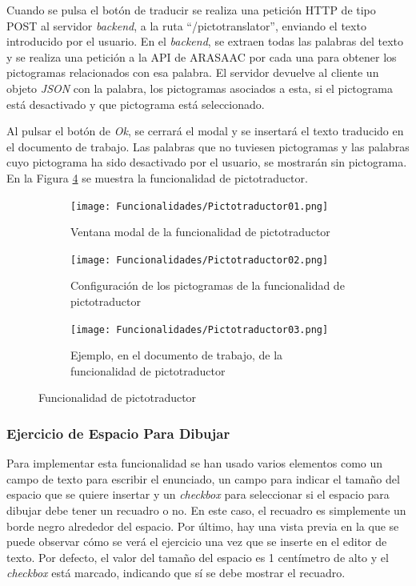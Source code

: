 Cuando se pulsa el botón de traducir se realiza una petición HTTP de tipo POST al servidor \textit{backend}, a la ruta ``/pictotranslator'', enviando el texto introducido por el usuario. En el \textit{backend}, se extraen todas las palabras del texto y se realiza una petición a la API de ARASAAC por cada una para obtener los pictogramas relacionados con esa palabra. El servidor devuelve al cliente un objeto \textit{JSON} con la palabra, los pictogramas asociados a esta, si el pictograma está desactivado y que pictograma está seleccionado.

Al pulsar el botón de \textit{Ok}, se cerrará el modal y se insertará el texto traducido en el documento de trabajo. Las palabras que no tuviesen pictogramas y las palabras cuyo pictograma ha sido desactivado por el usuario, se mostrarán sin pictograma. En la Figura \ref{fig:imppictotraductor} se muestra la funcionalidad de pictotraductor.

\begin{figure}[ht!]
  \centering
  \begin{subfigure}{\textwidth}
    \centering
    \texttt{[image: Funcionalidades/Pictotraductor01.png]}
    \caption{Ventana modal de la funcionalidad de pictotraductor}
    \label{fig:imppictotraductor01}
  \end{subfigure}

  \begin{subfigure}{\textwidth}
    \centering
    \texttt{[image: Funcionalidades/Pictotraductor02.png]}
    \caption{Configuración de los pictogramas de la funcionalidad de pictotraductor}
    \label{fig:imppictotraductor02}
  \end{subfigure}

  \begin{subfigure}{\textwidth}
    \centering
    \texttt{[image: Funcionalidades/Pictotraductor03.png]}
    \caption{Ejemplo, en el documento de trabajo, de la funcionalidad de pictotraductor}
    \label{fig:imppictotraductor03}
  \end{subfigure}

  \caption{Funcionalidad de pictotraductor}
  \label{fig:imppictotraductor}
\end{figure}


\subsubsection{Ejercicio de Espacio Para Dibujar}
\label{sec:impespacioparadibujar}

Para implementar esta funcionalidad se han usado varios elementos como un campo de texto para escribir el enunciado, un campo para indicar el tamaño del espacio que se quiere insertar y un \textit{checkbox} para seleccionar si el espacio para dibujar debe tener un recuadro o no. En este caso, el recuadro es simplemente un borde negro alrededor del espacio. Por último, hay una vista previa en la que se puede observar cómo se verá el ejercicio una vez que se inserte en el editor de texto. Por defecto, el valor del tamaño del espacio es 1 centímetro de alto y el \textit{checkbox} está marcado, indicando que sí se debe mostrar el recuadro.

